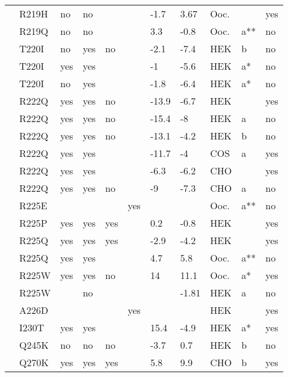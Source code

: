 \begin{tiny}
\begin{longtable}{p{4cm}|l|llll|ll|lll}
\citet{GosselinBadaroudine2012MutationDB} & R219H & no & no &  &  & -1.7 & 3.67 & Ooc. &  & yes \\
\citet{Chen1996MutationDB} & R219Q & no & no &  &  & 3.3 & -0.8 & Ooc. & a** & no \\
\citet{Beyder2014MutationDB} & T220I & no & yes & no &  & -2.1 & -7.4 & HEK & b & no \\
\citet{Gui2010aMutationDB} & T220I & yes & yes &  &  & -1 & -5.6 & HEK & a* & no \\
\citet{Gui2010bMutationDB} & T220I & no & yes &  &  & -1.8 & -6.4 & HEK & a* & no \\
\citet{Beckermann2014MutationDB} & R222Q & yes & yes & no &  & -13.9 & -6.7 & HEK &  & yes \\
\citet{Cheng2010MutationDB} & R222Q & yes & yes & no &  & -15.4 & -8 & HEK & a & no \\
\citet{Cheng2010MutationDB} & R222Q & yes & yes & no &  & -13.1 & -4.2 & HEK & b & no \\
\citet{Laurent2012MutationDB} & R222Q & yes & yes &  &  & -11.7 & -4 & COS & a & yes \\
\citet{Mann2012MutationDB} & R222Q & yes & yes &  &  & -6.3 & -6.2 & CHO &  & yes \\
\citet{Nair2012MutationDB} & R222Q & yes & yes & no &  & -9 & -7.3 & CHO & a & no \\
\citet{Chen1996MutationDB} & R225E &  &  &  & yes &  &  & Ooc. & a** & no \\
\citet{Beckermann2014MutationDB} & R225P & yes & yes & yes &  & 0.2 & -0.8 & HEK &  & yes \\
\citet{Beckermann2014MutationDB} & R225Q & yes & yes & yes &  & -2.9 & -4.2 & HEK &  & yes \\
\citet{Chen1996MutationDB} & R225Q & yes & yes &  &  & 4.7 & 5.8 & Ooc. & a** & no \\
\citet{Bezzina2003MutationDB} & R225W & yes & yes & no &  & 14 & 11.1 & Ooc. & a* & yes \\
\citet{Hoshi2014MutationDB} & R225W &  & no &  &  &  & -1.81 & HEK & a & no \\
\citet{Watanabe2011aMutationDB} & A226D &  &  &  & yes &  &  & HEK &  & yes \\
\citet{Neu2010MutationDB} & I230T & yes & yes &  &  & 15.4 & -4.9 & HEK & a* & yes \\
\citet{Kapplinger2015MutationDB} & Q245K & no & no & no &  & -3.7 & 0.7 & HEK & b & no \\
\citet{Calloe2011MutationDB} & Q270K & yes & yes & yes &  & 5.8 & 9.9 & CHO & b & yes \\

\end{longtable}
\end{tiny}
